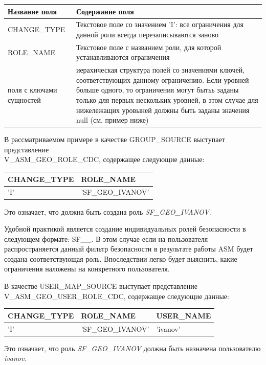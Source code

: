 \documentclass[../user-manual.tex]{subfiles}
\begin{document}
\begin{itemize}
		\begin{center}
			\begin{tabular}{|l|p{}|}
				\hline
				Название поля & Содержание поля \\
				\hline
				CHANGE\_TYPE & Текстовое поле со значением 'I': все ограничения для данной роли всегда перезаписываются заново \\
				\hline
				ROLE\_NAME & Текстовое поле с названием роли, для которой устанавливаются ограничения \\
				\hline
				поля с ключами сущностей & иерахическая структура полей со значениями ключей, соответствующих данному ограничению. Если уровней больше одного, то ограничения могут бытьь заданы только для первых нескольких уровней, в этом случае для нижележащих уровыней должны быть заданы значения null (см. пример ниже) \\
				\hline
			\end{tabular}
		\end{center}		
		
	\end{itemize}
	
	В рассматриваемом примере в качестве GROUP\_SOURCE выступает представление \\ V\_ASM\_GEO\_ROLE\_CDC, содержащее следующие данные:
		\begin{center}
			\begin{tabular}{|l|l|}
				\hline
				\textbf{CHANGE\_TYPE} & \textbf{ROLE\_NAME} \\
				\hline
				'I' & 'SF\_GEO\_IVANOV'\\
				\hline
			\end{tabular}
		\end{center}
	Это означает, что должна быть создана роль \textit{SF\_GEO\_IVANOV}.
	
	\begin{adminnote}
		Удобной практикой является создание индивидуальных ролей безопасности в следующем формате: SF\_<обозначение фильтра безопасности>\_<логин пользователя>. В этом случае если на пользователя распространяется данный фильтр безопасности в результате работы ASM будет создана соответствующая роль. Впоследствии легко будет выяснить, какие ограничения наложены на конкретного пользователя.
	\end{adminnote}

	В качестве USER\_MAP\_SOURCE выступает представление V\_ASM\_GEO\_USER\_ROLE\_CDC, содержащее следующие данные:
		\begin{center}
			\begin{tabular}{|l|l|l|}
				\hline
				\textbf{CHANGE\_TYPE} & \textbf{ROLE\_NAME} & \textbf{USER\_NAME} \\
				\hline
				'I' & 'SF\_GEO\_IVANOV' & 'ivanov'\\
				\hline
			\end{tabular}
		\end{center}	
	Это означает, что роль \textit{SF\_GEO\_IVANOV} должна быть назначена пользователю \textit{ivanov}.
	
\end{document}
